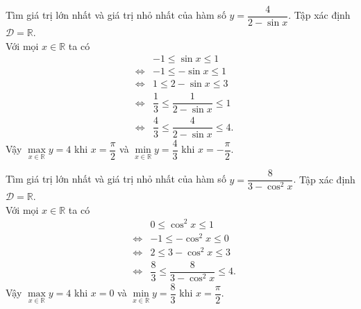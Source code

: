 \setcounter{bt}{8}
\begin{bt}%
	Tìm giá trị lớn nhất và giá trị nhỏ nhất của hàm số $y=\dfrac{4}{2-\sin x}$.
	\loigiai
	{Tập xác định $\mathscr{D}=\mathbb{R}$.\\
		Với mọi $x\in \mathbb{R}$ ta có
		\allowdisplaybreaks
		\begin{eqnarray*}
			& & -1\leq \sin x\leq 1\\
			&\Leftrightarrow& -1\leq -\sin x\leq 1\\
			&\Leftrightarrow&1\leq 2-\sin x\leq 3\\
			&\Leftrightarrow& \dfrac{1}{3}\leq \dfrac{1}{2-\sin x}\leq 1\\
			&\Leftrightarrow& \dfrac{4}{3}\leq \dfrac{4}{2-\sin x}\leq 4.
		\end{eqnarray*} 
		Vậy $\max\limits_{x \in \mathbb{R}} y=4$ khi $x=\dfrac{\pi}{2}$ và $\min\limits_{x \in \mathbb{R}} y=\dfrac{4}{3}$ khi $x=-\dfrac{\pi}{2}$.
	}
\end{bt}
\begin{bt}%
	Tìm giá trị lớn nhất và giá trị nhỏ nhất của hàm số $y=\dfrac{8}{3-\cos ^{2} x}$.
	\loigiai
	{Tập xác định $\mathscr{D}=\mathbb{R}$.\\
		Với mọi $x\in \mathbb{R}$ ta có
		\allowdisplaybreaks
		\begin{eqnarray*}
			& & 0\leq \cos^2 x\leq 1\\
			&\Leftrightarrow& -1\leq -\cos^2 x\leq 0\\
			&\Leftrightarrow&2\leq 3-\cos^2 x\leq 3\\
			&\Leftrightarrow&  \dfrac{8}{3}\leq \dfrac{8}{3-\cos^2 x}\leq 4.
		\end{eqnarray*}
		Vậy $\max\limits_{x \in \mathbb{R}} y=4$ khi $x=0$ và $\min\limits_{x \in \mathbb{R}} y=\dfrac{8}{3}$ khi $x=\dfrac{\pi}{2}$.
	}
\end{bt}


